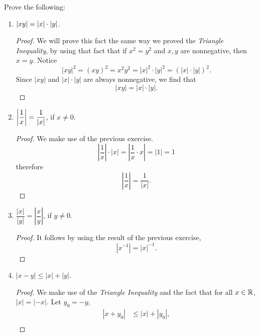 \begin{exercise}[\textbf{12}] Prove the following:
     \begin{enumerate}
         \item $\left\lvert xy\right\rvert = \left\lvert x\right\rvert \cdot \left\lvert y\right\rvert$.
         \begin{proof} We will prove this fact the same way we proved the
         \emph{Triangle Inequality}, by using that fact that if $x^2 = y^2$ and
         $x,y$ are nonnegative, then $x=y$. Notice
              \begin{equation*}
                  |xy|^2 = (xy)^2 = x^2y^2 = |x|^2\cdot |y|^2 = (|x|\cdot |y|)^2.
              \end{equation*}
        Since $|xy|$ and $|x|\cdot |y|$ are always nonnegative, we find that 
        \begin{equation*}
            |xy| = |x|\cdot |y|.
        \end{equation*}
         \end{proof}
         \item $\left| \dfrac{1}{x} \right|  = \dfrac{1}{\left\lvert x\right\rvert}$, if $x\neq
         0$.
         \begin{proof} We make use of the previous exercise.
              \begin{equation*}
                \left| \frac{1}{x}\right| \cdot |x| = \left| \frac{1}{x}\cdot x\right| =  |1| = 1
              \end{equation*}
              therefore
              \begin{equation*}
                  \left| \frac{1}{x} \right| = \frac{1}{|x|}.
              \end{equation*}
         \end{proof}
         \item $\dfrac{|x|}{|y|} = \left| \dfrac{x}{y}\right|$, if $y\neq 0$.
         \begin{proof} It follows by using the result of the previous exercise,
            \begin{equation*}
                |x^{-1}| = |x|^{-1}.
            \end{equation*}
         \end{proof}
         \item $|x-y| \leq |x|+|y|$.
         \begin{proof} We make use of the \emph{Triangle Inequality} and the
         fact that for all $x\in \mathbb{R}$, $|x|=|-x|$. Let $y_0 = -y$, 
              \begin{align*}
                  |x+y_0| &\leq |x|+|y_0|, \\

\end{align*}
\end{proof}
\end{enumerate}
\end{exercise}
